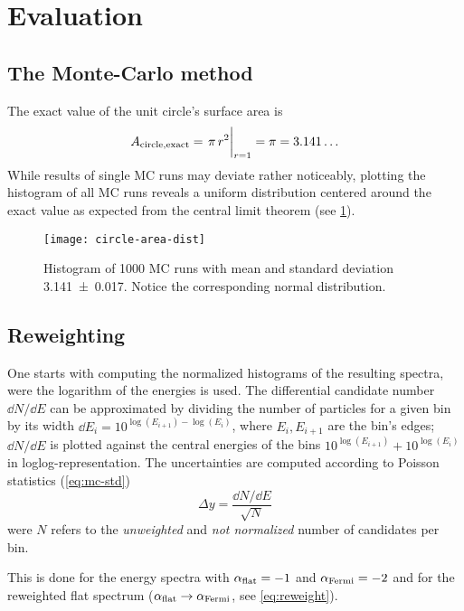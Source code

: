 \section{Evaluation}
\subsection{The Monte-Carlo method}
\label{sec:eval-circle}
The exact value of the unit circle's surface area is
\begin{equation}
    A_{\mathrm{circle,exact}}=\eval{\pi\,r^2}_{r=1}=\pi=3.141\dotso
    \label{eq:circle-area-exact}
\end{equation}
While results of single MC runs may deviate rather noticeably,
plotting the histogram of all MC runs reveals a uniform distribution
centered around the exact value as expected from the central
limit theorem (see \cref{fig:circle-area-hist}).

\begin{figure}[ht]
    \centering
    \texttt{[image: circle-area-dist]}
    \caption{Histogram of \num{1000} MC runs with mean and standard
    deviation \num{3.141(17)}. Notice the corresponding normal
distribution.}
    \label{fig:circle-area-hist}
\end{figure}

\subsection{Reweighting}
\label{sec:eval-rew}
One starts with computing the normalized histograms of the resulting spectra,
were the logarithm of the energies is used. The differential candidate number
$\dd{N}/\dd{E}$ can be approximated by dividing the number of particles for a
given bin by its width $\dd{E_i}=10^{\log(E_{i+1})-\log(E_{i})}$, where $E_{i},
E_{i+1}$ are the bin's edges; $\dd{N}/\dd{E}$ is plotted against the central
energies of the bins $10^{\log(E_{i+1})}+10^{\log(E_{i})}$ in
loglog-representation. The uncertainties are computed according to Poisson
statistics (\cref{eq:mc-std})
\begin{equation*}
    \Delta{y}=\frac{\dd{N}/\dd{E}}{\sqrt{N}}
\end{equation*}
were $N$ refers to the \emph{unweighted} and \emph{not normalized} number of
candidates per bin.

This is done for the energy spectra with $\alpha_{\mathrm{flat}}=-1$ and
$\alpha_{\mathrm{Fermi}}=-2$ and for the reweighted flat spectrum
($\alpha_{\mathrm{flat}}\to\alpha_{\mathrm{Fermi}}$, see \cref{eq:reweight}).

